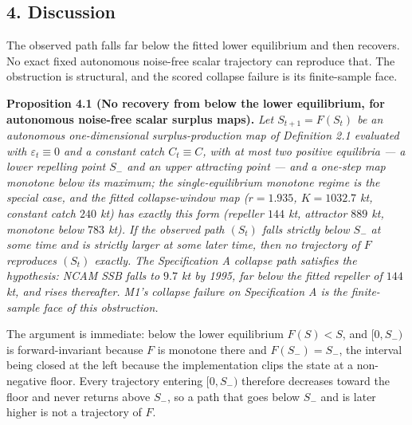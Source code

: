 \documentclass[11pt]{article}
\begin{document}
\subsection{4. Discussion}\label{discussion}

The observed path falls far below the fitted lower equilibrium and then
recovers. No exact fixed autonomous noise-free scalar trajectory can
reproduce that. The obstruction is structural, and the scored collapse
failure is its finite-sample face.

\textbf{Proposition 4.1 (No recovery from below the lower equilibrium,
for autonomous noise-free scalar surplus maps).} \emph{Let
\(S_{t+1}=F(S_t)\) be an autonomous one-dimensional surplus-production
map of Definition 2.1 evaluated with \(\varepsilon_t \equiv 0\) and a
constant catch \(C_t \equiv C\), with at most two positive equilibria --- a lower
repelling point \(S_-\) and an upper attracting point --- and a one-step
map monotone below its maximum; the single-equilibrium monotone regime
is the special case, and the fitted collapse-window map (\(r = 1.935\),
\(K = 1032.7\) kt, constant catch \(240\) kt) has exactly this form
(repeller \(144\) kt, attractor \(889\) kt, monotone below \(783\) kt).
If the observed path \((S_t)\) falls strictly below \(S_-\) at some
time and is strictly larger at some later time, then no trajectory of
\(F\) reproduces \((S_t)\) exactly. The Specification A collapse path
satisfies the hypothesis: NCAM SSB falls to \(9.7\) kt by 1995, far
below the fitted repeller of \(144\) kt, and rises thereafter. M1's
collapse failure on Specification A is the finite-sample face of this
obstruction.}

The argument is immediate: below the lower equilibrium \(F(S) < S\), and
\([0, S_-)\) is forward-invariant because \(F\) is monotone there and
\(F(S_-) = S_-\), the interval being closed at the left because the
implementation clips the state at a non-negative floor. Every trajectory
entering \([0, S_-)\) therefore decreases toward the floor and never
returns above \(S_-\), so a path that goes below \(S_-\) and is later
higher is not a trajectory of \(F\).
\end{document}

